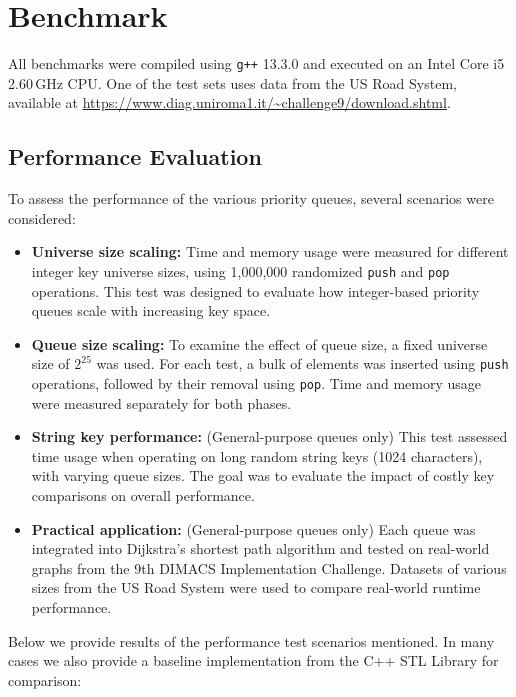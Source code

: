 \section{Benchmark}

All benchmarks were compiled using \texttt{g++} 13.3.0 and executed on an Intel Core i5 2.60\,GHz CPU. One of the test sets uses data from the US Road System, available at \url{https://www.diag.uniroma1.it/~challenge9/download.shtml}.

\subsection{Performance Evaluation}

To assess the performance of the various priority queues, several scenarios were considered:

\begin{itemize}
  \item \textbf{Universe size scaling:} Time and memory usage were measured for different integer key universe sizes, using 1,000,000 randomized \texttt{push} and \texttt{pop} operations. This test was designed to evaluate how integer-based priority queues scale with increasing key space.

  \item \textbf{Queue size scaling:} To examine the effect of queue size, a fixed universe size of $2^{25}$ was used. For each test, a bulk of elements was inserted using \texttt{push} operations, followed by their removal using \texttt{pop}. Time and memory usage were measured separately for both phases.

  \item \textbf{String key performance:} (General-purpose queues only) This test assessed time usage when operating on long random string keys (1024 characters), with varying queue sizes. The goal was to evaluate the impact of costly key comparisons on overall performance.

  \item \textbf{Practical application:} (General-purpose queues only) Each queue was integrated into Dijkstra's shortest path algorithm and tested on real-world graphs from the 9th DIMACS Implementation Challenge. Datasets of various sizes from the US Road System were used to compare real-world runtime performance.
\end{itemize}

Below we provide results of the performance test scenarios mentioned. In many cases we also provide a baseline implementation from the C++ STL Library for comparison:

